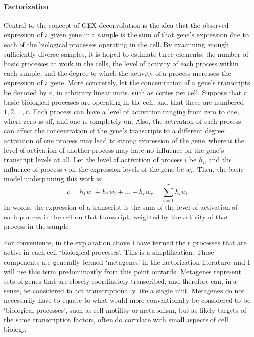 \documentclass[dissertation.tex]{subfiles}
\begin{document}
\paragraph{Factorization}
Central to the concept of \gls{GEX} deconvolution is the idea that the observed expression of a given gene in a sample is the sum of that gene's expression due to each of the biological processes operating in the cell.  By examining enough sufficiently diverse samples, it is hoped to estimate three elements: the number of basic processes at work in the cells, the level of activity of each process within each sample, and the degree to which the activity of a process increases the expression of a gene.  More concretely, let the concentration of a gene's transcripts be denoted by $a$, in arbitrary linear units, such as copies per cell.  Suppose that $r$ basic biological processes are operating in the cell, and that these are numbered $1, 2, \dots, r$.  Each process can have a level of activation ranging from zero to one, where zero is off, and one is completely on.  Also, the activation of each process can affect the concentration of the gene's transcripts to a different degree: activation of one process may lead to strong expression of the gene, whereas the level of activation of another process may have no influence on the gene's transcript levels at all.  Let the level of activation of process $i$ be $h_i$, and the influence of process $i$ on the expression levels of the gene be $w_i$.  Then, the basic model underpinning this work is:
\begin{equation}
  a = h_1 w_1 + h_2 w_2 + \dots + h_r w_r = \sum_{i=1}^r h_i w_i
\end{equation}
In words, the expression of a transcript is the sum of the level of activation of each process in the cell on that transcript, weighted by the activity of that process in the sample.

For convenience, in the explanation above I have termed the $r$ processes that are active in each cell `biological processes'.  This is a simplification.  These components are generally termed `metagenes' in the factorization literature, and I will use this term predominantly from this point onwards.  Metagenes represent sets of genes that are closely coordinately transcribed, and therefore can, in a sense, be considered to act transcriptionally like a single unit.  Metagenes do not necessarily have to equate to what would more conventionally be considered to be `biological processes', such as cell motility or metabolism, but as likely targets of the same transcription factors, often do correlate with small aspects of cell biology.
\end{document}
